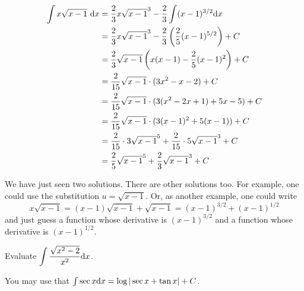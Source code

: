\begin{solution}
\begin{description}
\begin{align*}
\int x\sqrt{x-1}~\mathrm{d}x&=\frac{2}{3}x\sqrt{x-1}^3 - \frac{2}{3}\int(x-1)^{3/2}\mathrm{d}x \\
&= \frac{2}{3}x\sqrt{x-1}^3 - \frac{2}{3}\left(\frac{2}{5}(x-1)^{5/2}\right)+C\\
&=\frac{2}{3}\sqrt{x-1}\left(x(x-1)-\frac{2}{5}(x-1)^2\right)+C\\
&=\frac{2}{15}\sqrt{x-1}\cdot(3x^2-x-2)+C\\
&=\frac{2}{15}\sqrt{x-1}\cdot(3(x^2-2x+1)+5x-5)+C\\
&=\frac{2}{15}\sqrt{x-1}\cdot(3(x-1)^2+5(x-1))+C\\
&=\frac{2}{15}\cdot 3\sqrt{x-1}^5 +\frac{2}{15}\cdot 5\sqrt{x-1}^3+C\\
&=\frac{2}{5}\sqrt{x-1}^5 +\frac{2}{3}\sqrt{x-1}^3+C
\end{align*}
\end{description}
We have just seen two solutions. There are other solutions too. For example, one could use the substitution $u=\sqrt{x-1}$. Or, as another example, one could write
\begin{equation*}
x\sqrt{x-1} = (x-1)\sqrt{x-1} +\sqrt{x-1} = (x-1)^{3/2} + (x-1)^{1/2}
\end{equation*}
and just guess a function whose derivative is $(x-1)^{3/2}$ and a function whose derivative is 
$(x-1)^{1/2}$. 
\begin{comment}
Using the substitution $u=\sqrt{x-1}$, $x=u^2+1$, $\dee{x}=2u\,\dee{u}$
\begin{align*}
\int x\sqrt{x-1}~\dee{x}&= \int(u^2+1)\,u\,2u\,\dee{u} \\
                        &= 2\int (u^4+u^2)\,\dee{u} \\
                        &=\tfrac{2}{5} u^5 +\tfrac{2}{3}u^3 + C \\
     &=\frac{2}{5}\sqrt{x-1}^5 +\frac{2}{3}\sqrt{x-1}^3+C
\end{align*} 
\end{comment}
\end{solution}







\begin{question} Evaluate
$\displaystyle\int \frac{\sqrt{x^2-2}}{x^2}\mathrm{d}x$.

You may use that  $\int \sec x\mathrm{d}x = \log|\sec x+\tan x| +C$.
\end{question}

